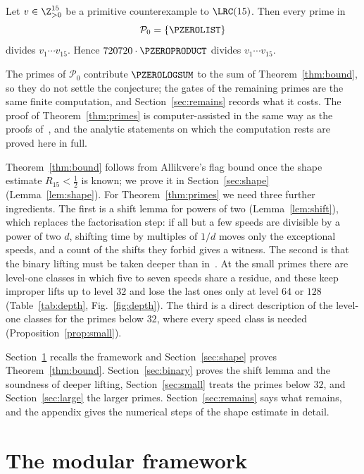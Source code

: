 \begin{theorem}\label{thm:primes}
Let $v\in\Z_{>0}^{15}$ be a primitive counterexample to $\LRC(15)$. Then every
prime in
\[
 \mathcal P_0=\{\PZEROLIST\}
\]
divides $v_1\cdots v_{15}$. Hence
$720720\cdot\PZEROPRODUCT$ divides $v_1\cdots v_{15}$.
\end{theorem}

The primes of $\mathcal P_0$ contribute $\PZEROLOGSUM$ to the sum of
Theorem~\ref{thm:bound}, so they do not settle the conjecture; the gates of
the remaining primes are the same finite computation, and
Section~\ref{sec:remains} records what it costs. The proof of
Theorem~\ref{thm:primes} is computer-assisted in the same way as the proofs
of~\cite{ST26,All26}, and the analytic statements on which the computation
rests are proved here in full.

Theorem~\ref{thm:bound} follows from Allikvere's flag bound once the shape
estimate $R_{15}<\frac12$ is known; we prove it in
Section~\ref{sec:shape} (Lemma~\ref{lem:shape}). For
Theorem~\ref{thm:primes} we need three further ingredients. The first is a
shift lemma for powers of two (Lemma~\ref{lem:shift}), which replaces the
factorisation step: if all but a few speeds are divisible by a power of two
$d$, shifting time by multiples of $1/d$ moves only the exceptional speeds,
and a count of the shifts they forbid gives a witness. The second is that
the binary lifting must be taken deeper than in~\cite{All26}. At the small
primes there are level-one classes in which five to seven speeds share a
residue, and these keep improper lifts up to level $32$ and lose the last
ones only at level $64$ or $128$ (Table~\ref{tab:depth},
Fig.~\ref{fig:depth}). The third is a direct description of the level-one
classes for the primes below $32$, where every speed class is needed
(Proposition~\ref{prop:small}).

Section~\ref{sec:framework} recalls the framework and
Section~\ref{sec:shape} proves Theorem~\ref{thm:bound}.
Section~\ref{sec:binary} proves the shift lemma and the soundness of deeper
lifting, Section~\ref{sec:small} treats the primes below $32$, and
Section~\ref{sec:large} the larger primes. Section~\ref{sec:remains} says
what remains, and the appendix gives the numerical steps of the shape
estimate in detail.

\section{The modular framework}\label{sec:framework}

